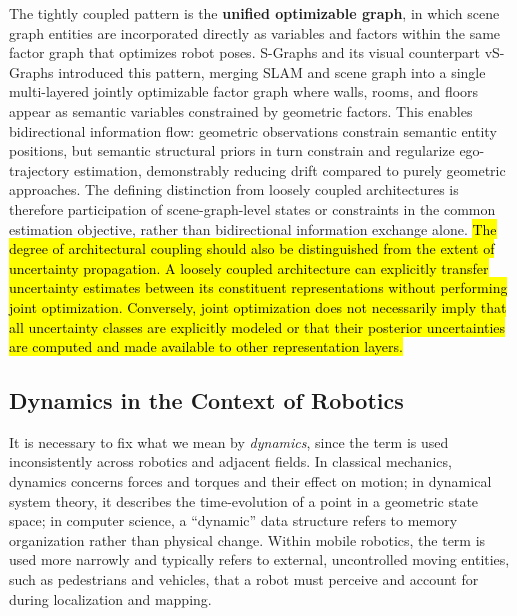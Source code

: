 The tightly coupled pattern is the \textbf{unified optimizable graph}, in which scene graph entities are incorporated directly as variables and factors within the same factor graph that optimizes robot poses. 
S-Graphs \cite{bavle_s-graphs_2025} and its visual counterpart vS-Graphs \cite{tourani2026vs} introduced this pattern, merging SLAM and scene graph into a single multi-layered jointly optimizable factor graph where walls, rooms, and floors appear as semantic variables constrained by geometric factors.
This enables bidirectional information flow: geometric observations constrain semantic entity positions, but semantic structural priors in turn constrain and regularize ego-trajectory estimation, demonstrably reducing drift compared to purely geometric approaches.
The defining distinction from loosely coupled architectures is therefore participation of scene-graph-level states or constraints in the common estimation objective, rather than bidirectional information exchange alone.
\hl{The degree of architectural coupling should also be distinguished from the extent of uncertainty propagation.
A loosely coupled architecture can explicitly transfer uncertainty estimates between its constituent representations without performing joint optimization. Conversely, joint optimization does not necessarily imply that all uncertainty classes are explicitly modeled or that their posterior uncertainties are computed and made available to other representation layers.}

\subsection{Dynamics in the Context of Robotics}\label{sec:background_dynamics_definition}
It is necessary to fix what we mean by \textit{dynamics}, since the term is used inconsistently across robotics and adjacent fields. 
In classical mechanics, dynamics concerns forces and torques and their effect on motion; in dynamical system theory, it describes the time-evolution of a point in a geometric state space; in computer science, a ``dynamic'' data structure refers to memory organization rather than physical change. 
Within mobile robotics, the term is used more narrowly and typically refers to external, uncontrolled moving entities, such as pedestrians and vehicles, that a robot must perceive and account for during localization and mapping\cite{kucner_survey_2023}. 

